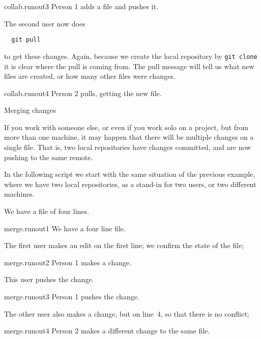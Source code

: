 \begin{gitstep}{collab.runout3}
  Person 1 adds a file and pushes it.
\end{gitstep}

The second user now does
\begin{lstlisting}
  git pull
\end{lstlisting}
to get these changes.
Again, because we create the local repository by \lstinline{git clone}
it is clear where the pull is coming from.
The pull message will tell us what new files are created,
or how many other files were changes.

\begin{gitstep}{collab.runout4}
  Person 2 pulls, getting the new file.
\end{gitstep}

 {Merging changes}

If you work with someone else, or even if you work solo on a project,
but from more than one machine, it may happen that there will be multiple
changes on a single file. That is, two local repositories have changes committed,
and are now pushing to the same remote.

In the following script we start with the same situation of the previous example,
where we have two local repositories, as a stand-in for two users,
or two different machines.

We have a file of four lines.

\begin{gitstep}{merge.runout1}
  We have a four line file.
\end{gitstep}

The first user makes an edit on the first line; we confirm the state of the file;

\begin{gitstep}{merge.runout2}
  Person 1 makes a change.
\end{gitstep}

This user pushes the change.

\begin{gitstep}{merge.runout3}
  Person 1 pushes the change.
\end{gitstep}

The other user also makes a change, but on line~4, so that there is no conflict;

\begin{gitstep}{merge.runout4}
  Person 2 makes a different change to the same file.
\end{gitstep}

